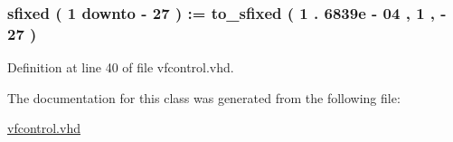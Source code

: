 \subsubsection[{mstep}]{ {\bfseries \textcolor{comment}{sfixed}\textcolor{vhdlchar}{ }\textcolor{vhdlchar}{(}\textcolor{vhdlchar}{ }\textcolor{vhdlchar}{ } \textcolor{vhdldigit}{1} \textcolor{vhdlchar}{ }\textcolor{keywordflow}{downto}\textcolor{vhdlchar}{ }\textcolor{vhdlchar}{-\/}\textcolor{vhdlchar}{ } \textcolor{vhdldigit}{27} \textcolor{vhdlchar}{ }\textcolor{vhdlchar}{)}\textcolor{vhdlchar}{ }\textcolor{vhdlchar}{ }\textcolor{vhdlchar}{ }\textcolor{vhdlchar}{\+:}\textcolor{vhdlchar}{=}\textcolor{vhdlchar}{ }\textcolor{vhdlchar}{ }\textcolor{vhdlchar}{ }\textcolor{vhdlchar}{ }\textcolor{vhdlchar}{to\+\_\+sfixed}\textcolor{vhdlchar}{ }\textcolor{vhdlchar}{(}\textcolor{vhdlchar}{ }\textcolor{vhdlchar}{ } \textcolor{vhdldigit}{1} \textcolor{vhdlchar}{.} \textcolor{vhdldigit}{6839e} \textcolor{vhdlchar}{-\/} \textcolor{vhdldigit}{04} \textcolor{vhdlchar}{ }\textcolor{vhdlchar}{,}\textcolor{vhdlchar}{ }\textcolor{vhdlchar}{ } \textcolor{vhdldigit}{1} \textcolor{vhdlchar}{ }\textcolor{vhdlchar}{,}\textcolor{vhdlchar}{ }\textcolor{vhdlchar}{-\/}\textcolor{vhdlchar}{ } \textcolor{vhdldigit}{27} \textcolor{vhdlchar}{ }\textcolor{vhdlchar}{)}\textcolor{vhdlchar}{ }} \hspace{0.3cm}{\ttfamily [Signal]}}\label{classvfcontrol_1_1vfcontrol__arch_a3d5f05a872732b773487db45eaac7e4f}


Definition at line 40 of file vfcontrol.\+vhd.



The documentation for this class was generated from the following file\+:\begin{DoxyCompactItemize}
\item 
\hyperlink{vfcontrol_8vhd}{vfcontrol.\+vhd}\end{DoxyCompactItemize}
